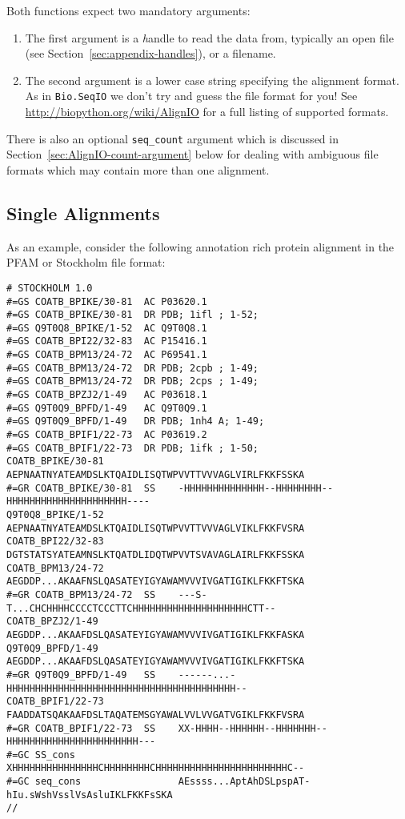 Both functions expect two mandatory arguments:

\begin{enumerate}
\item The first argument is a {\textit handle} to read the data from, typically an open file (see Section~\ref{sec:appendix-handles}), or a filename.
\item The second argument is a lower case string specifying the alignment format.  As in \verb|Bio.SeqIO| we don't try and guess the file format for you!  See \url{http://biopython.org/wiki/AlignIO} for a full listing of supported formats.
\end{enumerate}

\noindent There is also an optional \verb|seq_count| argument which is discussed in Section~\ref{sec:AlignIO-count-argument} below for dealing with ambiguous file formats which may contain more than one alignment.

\subsection{Single Alignments}
As an example, consider the following annotation rich protein alignment in the PFAM or Stockholm file format:

\begin{verbatim}
# STOCKHOLM 1.0
#=GS COATB_BPIKE/30-81  AC P03620.1
#=GS COATB_BPIKE/30-81  DR PDB; 1ifl ; 1-52;
#=GS Q9T0Q8_BPIKE/1-52  AC Q9T0Q8.1
#=GS COATB_BPI22/32-83  AC P15416.1
#=GS COATB_BPM13/24-72  AC P69541.1
#=GS COATB_BPM13/24-72  DR PDB; 2cpb ; 1-49;
#=GS COATB_BPM13/24-72  DR PDB; 2cps ; 1-49;
#=GS COATB_BPZJ2/1-49   AC P03618.1
#=GS Q9T0Q9_BPFD/1-49   AC Q9T0Q9.1
#=GS Q9T0Q9_BPFD/1-49   DR PDB; 1nh4 A; 1-49;
#=GS COATB_BPIF1/22-73  AC P03619.2
#=GS COATB_BPIF1/22-73  DR PDB; 1ifk ; 1-50;
COATB_BPIKE/30-81             AEPNAATNYATEAMDSLKTQAIDLISQTWPVVTTVVVAGLVIRLFKKFSSKA
#=GR COATB_BPIKE/30-81  SS    -HHHHHHHHHHHHHH--HHHHHHHH--HHHHHHHHHHHHHHHHHHHHH----
Q9T0Q8_BPIKE/1-52             AEPNAATNYATEAMDSLKTQAIDLISQTWPVVTTVVVAGLVIKLFKKFVSRA
COATB_BPI22/32-83             DGTSTATSYATEAMNSLKTQATDLIDQTWPVVTSVAVAGLAIRLFKKFSSKA
COATB_BPM13/24-72             AEGDDP...AKAAFNSLQASATEYIGYAWAMVVVIVGATIGIKLFKKFTSKA
#=GR COATB_BPM13/24-72  SS    ---S-T...CHCHHHHCCCCTCCCTTCHHHHHHHHHHHHHHHHHHHHCTT--
COATB_BPZJ2/1-49              AEGDDP...AKAAFDSLQASATEYIGYAWAMVVVIVGATIGIKLFKKFASKA
Q9T0Q9_BPFD/1-49              AEGDDP...AKAAFDSLQASATEYIGYAWAMVVVIVGATIGIKLFKKFTSKA
#=GR Q9T0Q9_BPFD/1-49   SS    ------...-HHHHHHHHHHHHHHHHHHHHHHHHHHHHHHHHHHHHHHHH--
COATB_BPIF1/22-73             FAADDATSQAKAAFDSLTAQATEMSGYAWALVVLVVGATVGIKLFKKFVSRA
#=GR COATB_BPIF1/22-73  SS    XX-HHHH--HHHHHH--HHHHHHH--HHHHHHHHHHHHHHHHHHHHHHH---
#=GC SS_cons                  XHHHHHHHHHHHHHHHCHHHHHHHHCHHHHHHHHHHHHHHHHHHHHHHHC--
#=GC seq_cons                 AEssss...AptAhDSLpspAT-hIu.sWshVsslVsAsluIKLFKKFsSKA
//
\end{verbatim}

